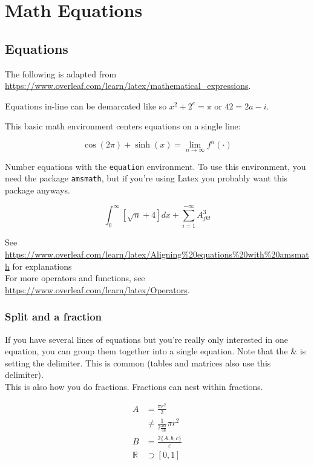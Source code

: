 
\section{Math Equations}



\subsection{Equations}
The following is adapted from \url{https://www.overleaf.com/learn/latex/mathematical_expressions}.



Equations in-line can be demarcated like so \(x^2 + 2^e = \pi \) or $42=2a-i$.

This basic math environment centers equations on a single line:

\[ \cos(2\pi)+\sinh(x)=\lim_{n\to \infty} f^n(\cdot)\]

Number equations with the \verb+equation+ environment. To use this environment, you need the package \verb+amsmath+, but if you're using Latex you probably want this package anyways.

\begin{equation}
	\int_{0}^{\infty} [\sqrt{n}+4] dx + \sum_{i=1}^{-\infty} A_{jkl}^{3}
\end{equation}

See \url{https://www.overleaf.com/learn/latex/Aligning%20equations%20with%20amsmath} for explanations\\

For more operators and functions, see \url{https://www.overleaf.com/learn/latex/Operators}.\\

\subsubsection{Split and a fraction}
If you have several lines of equations but you're really only interested in one equation, you can group them together into a single equation. Note that the \& is setting the delimiter. This is common (tables and matrices also use this delimiter).\\

This is also how you do fractions. Fractions can nest within fractions.

\begin{equation} \label{eq1}
	\begin{split}
		A & = \frac{\pi r^2}{2} \\
		& \neq  \frac{1}{2\frac{2\alpha}{48}} \pi r^2\\
		B & = \frac{2\{A,b,c\}}{\varepsilon}\\
		\mathbb{R} & \supset [0,1]
	\end{split}
\end{equation}


